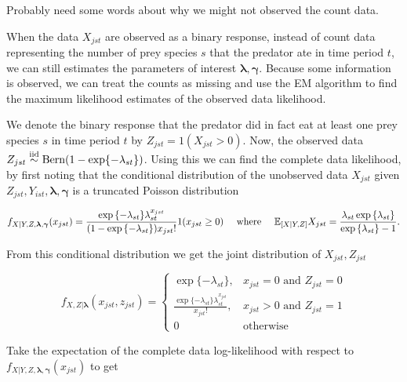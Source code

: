 Probably need some words about why we might not observed the count data.  

When the data $X_{jst}$ are observed as a binary response, instead of count data representing the number of prey species $s$ that the predator ate in time period $t$, we can still estimates the parameters of interest $\boldsymbol{\lambda}, \boldsymbol{\gamma}$.  Because some information is observed, we can treat the counts as missing and use the EM algorithm to find the maximum likelihood estimates of the observed data likelihood.  

We denote the binary response that the predator did in fact eat at least one prey species $s$ in time period $t$ by $Z_{jst} = 1(X_{jst} > 0)$.  Now, the observed data $Z_{jst} \stackrel{\mathrm{iid}}{\sim} \text{Bern}(1-\exp\{-\lambda_{st}\})$.  Using this we can find the complete data likelihood, by first noting that the conditional distribution of the unobserved data $X_{jst}$ given $Z_{jst}, Y_{ist}, \boldsymbol{\lambda}, \boldsymbol{\gamma}$ is a truncated Poisson distribution

\begin{equation*}
  f_{X|Y,Z,\boldsymbol{\lambda},\boldsymbol{\gamma}}(x_{jst}) =
  \frac{\exp{\{-\lambda_{st}\}} \lambda_{st}^{x_{jst}}}{(1 - \exp{\{-\lambda_{st}\}}) x_{jst}!}1(x_{jst} \geq 0) \quad \text{ where } \quad \mathbb{E}_{[X|Y,Z]}X_{jst} = \frac{\lambda_{st} \exp{\{\lambda_{st} \}}}{\exp{\{ \lambda_{st} \}} - 1}.
\end{equation*}

\noindent From this conditional distribution we get the joint distribution of $X_{jst}, Z_{jst}$

\begin{equation*}
    f_{X,Z|\boldsymbol{\lambda}}(x_{jst},z_{jst}) = \left\{
    \begin{array}{lr}
      \exp{\{ -\lambda_{st} \}}, & x_{jst}=0 \mbox{ and } Z_{jst} = 0 \\
      \frac{\exp{\{-\lambda_{st} \}} \lambda_{st}^{x_{jst}}}{x_{jst}!}, & x_{jst} > 0 \mbox{ and } Z_{jst} = 1\\
      0 & \mbox{otherwise}
    \end{array}
  \right.
\end{equation*}

\noindent  Take the expectation of the complete data log-likelihood with respect to $f_{X|Y,Z,\boldsymbol{\lambda},\boldsymbol{\gamma}}(x_{jst})$ to get

